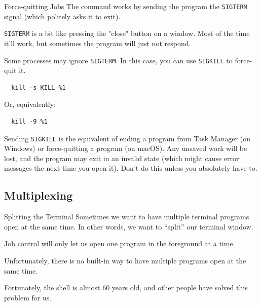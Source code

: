 \begin{frame}[fragile]{Force-quitting Jobs}
  The  command works by sending the program the \texttt{SIGTERM}
  signal (which politely asks it to exit).

   {
    \texttt{SIGTERM} is a bit like pressing the "close" button on a window.
    Most of the time it'll work, but sometimes the program will just not
    respond.
  }

  \pause

  Some processes may ignore \texttt{SIGTERM}.  In this case, you can use
  \texttt{SIGKILL} to force-quit it.

  \begin{verbatim}
  kill -s KILL %1
  \end{verbatim}

  Or, equivalently:
  \begin{verbatim}
  kill -9 %1
  \end{verbatim}

   {
    Sending \texttt{SIGKILL} is the equivalent of ending a program from Task
    Manager (on Windows) or force-quitting a program (on macOS).  Any unsaved
    work will be lost, and the program may exit in an invalid state (which
    might cause error messages the next time you open it).  Don't do this
    unless you absolutely have to.
  }
\end{frame}

\subsection{Multiplexing}

\begin{frame}{Splitting the Terminal}
  Sometimes we want to have multiple terminal programs open \alert<1>{at the
  same time}.  In other words, we want to \enquote{split} our terminal window.
  \pause


  Job control will only let us open one program in the foreground at a time.
  \pause

  Unfortunately, there is \alert<3>{no built-in way} to have multiple programs
  open at the same time.
  \pause

  Fortunately, the shell is almost 60 years old, and other people have solved
  this problem for us.
\end{frame}

